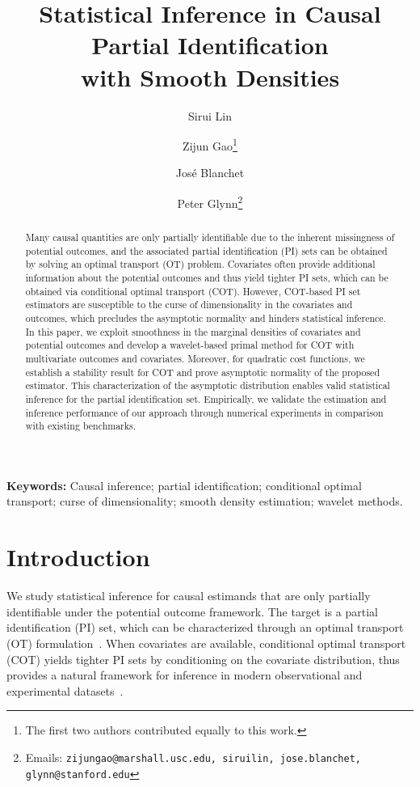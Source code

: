 \documentclass{article}
\title{Statistical Inference in Causal Partial Identification \\ with Smooth Densities}
\author[1]{Sirui Lin}
\author[2]{Zijun Gao\thanks{The first two authors contributed equally to this work.}}
\author[1]{Jos\'{e} Blanchet}
\author[1]{Peter Glynn\thanks{Emails: \texttt{zijungao@marshall.usc.edu,  siruilin, jose.blanchet, glynn@stanford.edu}}}
\affil[1]{Department of Management Science and Engineering, Stanford University}
\affil[2]{Marshall School of Business, University of Southern California}
\theoremstyle{plain}
\theoremstyle{definition}
\theoremstyle{plain}
\begin{document}
\maketitle
\begin{abstract}
Many causal quantities are only partially identifiable due to the inherent missingness of potential outcomes, and the associated partial identification (PI) sets can be obtained by solving an optimal transport (OT) problem.
Covariates often provide additional information about the potential outcomes and thus yield tighter PI sets, which can be obtained via conditional optimal transport (COT).
However, COT-based PI set estimators are susceptible to the curse of dimensionality in the covariates and outcomes, which precludes the asymptotic normality and hinders statistical inference.
In this paper, we exploit smoothness in the marginal densities of covariates and potential outcomes and develop a wavelet-based primal method for COT with multivariate outcomes and covariates.
Moreover, for quadratic cost functions, we establish a stability result for COT and prove asymptotic normality of the proposed estimator. This characterization of the asymptotic distribution enables valid statistical inference for the partial identification set.
Empirically, we validate the estimation and inference performance of our approach through numerical experiments in comparison with existing benchmarks.
\end{abstract}




\textbf{Keywords:} Causal inference; partial identification; conditional optimal transport; curse of dimensionality; smooth density estimation; wavelet methods.
\section{Introduction}\label{sec:introduction}

We study statistical inference for causal estimands that are only partially identifiable under the potential outcome framework. 
The target is a partial identification (PI) set, which can be characterized through an optimal transport (OT) formulation~\parencite{gao2024bridging}. 
When covariates are available, conditional optimal transport (COT) yields tighter PI sets by conditioning on the covariate distribution, thus provides a natural framework for inference in modern observational and experimental datasets~\parencite{ji2023model,lin2025estimation,fan2025partial}. 
\end{document}
